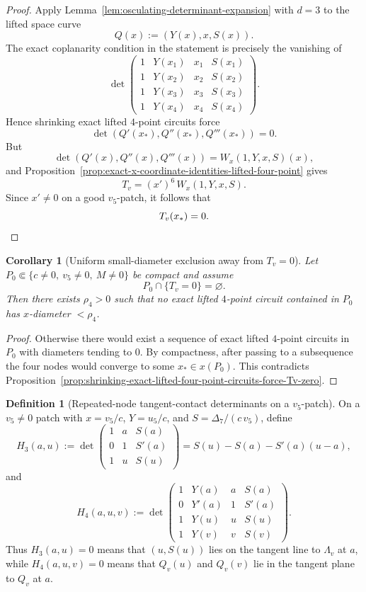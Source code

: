\documentclass[11pt,a4paper]{amsart}
\theoremstyle{plain}
\newtheorem{corollary}[theorem]{Corollary}
\theoremstyle{definition}
\newtheorem{definition}[theorem]{Definition}
\begin{document}
\begin{proof}
Apply Lemma~\ref{lem:osculating-determinant-expansion} with $d=3$ to the
lifted space curve
\[
Q(x):=(Y(x),x,S(x)).
\]
The exact coplanarity condition in the statement is precisely the vanishing of
\[
\det\!\begin{pmatrix}
1&Y(x_1)&x_1&S(x_1)\\
1&Y(x_2)&x_2&S(x_2)\\
1&Y(x_3)&x_3&S(x_3)\\
1&Y(x_4)&x_4&S(x_4)
\end{pmatrix}.
\]
Hence shrinking exact lifted $4$-point circuits force
\[
\det(Q'(x_*),Q''(x_*),Q'''(x_*))=0.
\]
But
\[
\det(Q'(x),Q''(x),Q'''(x))
=
W_x(1,Y,x,S)(x),
\]
and Proposition~\ref{prop:exact-x-coordinate-identities-lifted-four-point}
gives
\[
T_v=(x')^6\,W_x(1,Y,x,S).
\]
Since $x'\neq 0$ on a good $v_5$-patch, it follows that
\[
T_v(x_*)=0.
\qedhere
\]
\end{proof}

\begin{corollary}[Uniform small-diameter exclusion away from $T_v=0$]
\label{cor:uniform-small-diameter-exclusion-away-from-Tv-zero}
Let $P_0\Subset\{c\neq 0,\ v_5\neq 0,\ M\neq 0\}$ be compact and assume
\[
P_0\cap\{T_v=0\}=\varnothing.
\]
Then there exists $\rho_4>0$ such that no exact lifted $4$-point circuit
contained in $P_0$ has $x$-diameter $<\rho_4$.
\end{corollary}

\begin{proof}
Otherwise there would exist a sequence of exact lifted $4$-point circuits in
$P_0$ with diameters tending to $0$. By compactness, after passing to a
subsequence the four nodes would converge to some $x_*\in x(P_0)$. This
contradicts
Proposition~\ref{prop:shrinking-exact-lifted-four-point-circuits-force-Tv-zero}.
\end{proof}

\begin{definition}[Repeated-node tangent-contact determinants on a $v_5$-patch]
\label{def:repeated-node-tangent-contact-determinants-vpatch}
On a $v_5\neq 0$ patch with $x=v_5/c$, $Y=u_5/c$, and
$S=\Delta_7/(c\,v_5)$, define
\[
H_3(a,u):=
\det\!\begin{pmatrix}
1&a&S(a)\\
0&1&S'(a)\\
1&u&S(u)
\end{pmatrix}
=
S(u)-S(a)-S'(a)(u-a),
\]
and
\[
H_4(a,u,v):=
\det\!\begin{pmatrix}
1&Y(a)&a&S(a)\\
0&Y'(a)&1&S'(a)\\
1&Y(u)&u&S(u)\\
1&Y(v)&v&S(v)
\end{pmatrix}.
\]
Thus $H_3(a,u)=0$ means that $(u,S(u))$ lies on the tangent line to
$\Lambda_v$ at $a$, while $H_4(a,u,v)=0$ means that $Q_v(u)$ and
$Q_v(v)$ lie in the tangent plane to $Q_v$ at $a$.
\end{definition}
\end{document}
